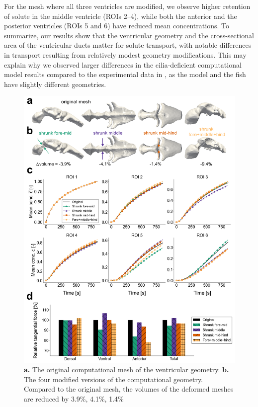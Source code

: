 \documentclass{WileyMSP-template}
\begin{document}
For the mesh where all three ventricles are modified,
we observe higher retention of solute in the middle ventricle (ROIs 2--4),
while both the anterior and the posterior ventricles (ROIs 5 and 6) have reduced
mean concentrations. To summarize, our results show that the
ventricular geometry and the cross-sectional area of the ventricular ducts matter
for solute transport, with notable differences in transport resulting from
relatively modest geometry modifications. This may explain why
we observed larger differences in the cilia-deficient computational
model results compared to the experimental data in ,
as the model and the fish have slightly different geometries.
\begin{figure}
    \centering
    \includegraphics[width=\textwidth]{graphics/figure6_compare_modified_geometries.png}
    \caption{\textbf{a.} The original computational mesh of the ventricular geometry.
    \textbf{b.} The four modified versions of the computational geometry. Compared
    to the original mesh, the volumes of the deformed meshes are reduced by 3.9\%, 4.1\%, 1.4\% 
}
\end{figure}
\end{document}
